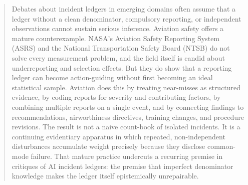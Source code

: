 \documentclass[11pt]{article}
\begin{document}
\maketitle
\begin{abstract}
Debates about incident ledgers in emerging domains often assume that a ledger without a clean denominator, compulsory reporting, or independent observations cannot sustain serious inference. Aviation safety offers a mature counterexample. NASA's Aviation Safety Reporting System (ASRS) and the National Transportation Safety Board (NTSB) do not solve every measurement problem, and the field itself is candid about underreporting and selection effects. But they do show that a reporting ledger can become action-guiding without first becoming an ideal statistical sample. Aviation does this by treating near-misses as structured evidence, by coding reports for severity and contributing factors, by combining multiple reports on a single event, and by connecting findings to recommendations, airworthiness directives, training changes, and procedure revisions. The result is not a naive count-book of isolated incidents. It is a continuing evidentiary apparatus in which repeated, non-independent disturbances accumulate weight precisely because they disclose common-mode failure. That mature practice undercuts a recurring premise in critiques of AI incident ledgers: the premise that imperfect denominator knowledge makes the ledger itself epistemically unrepairable.
\end{abstract}
\end{document}
